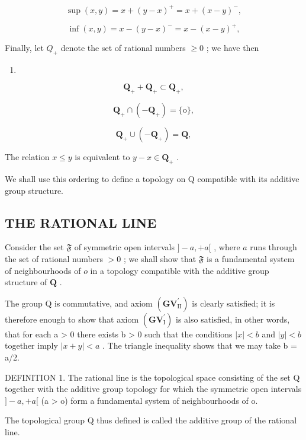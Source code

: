 \[
\sup (x, y) = x + (y - x) ^ {+} = x + (x - y) ^ {-},\tag{6}
\]

\[
\inf (x, y) = x - (y - x) ^ {-} = x - (x - y) ^ {+},\tag{7}
\]

Finally, let \(Q_{+}\) denote the set of rational numbers \(\geqslant0\) ; we have then

\begin{enumerate}
\def\labelenumi{(\arabic{enumi})}
\setcounter{enumi}{7}
\tightlist
\item
\end{enumerate}

\[
\mathbf {Q} _ {+} + \mathbf {Q} _ {+} \subset \mathbf {Q} _ {+},\tag{8}
\]

\[
\mathbf {Q} _ {+} \cap (- \mathbf {Q} _ {+}) = \{\mathrm{o} \},\tag{9}
\]

\[
\mathbf {Q} _ {+} \cup (- \mathbf {Q} _ {+}) = \mathbf {Q},\tag{10}
\]

The relation \(x \leqslant y\) is equivalent to \(y - x \in \mathbf{Q}_{+}\) .

We shall use this ordering to define a topology on Q compatible with its additive group structure.

\subsection{THE RATIONAL LINE}

Consider the set \(\mathfrak{F}\) of symmetric open intervals \(]-a, +a[\) , where \(a\) runs through the set of rational numbers \(>0\) ; we shall show that \(\mathfrak{F}\) is a fundamental system of neighbourhoods of \(o\) in a topology compatible with the additive group structure of \(\mathbf{Q}\) .

The group Q is commutative, and axiom \((\mathbf{GV}_{\mathrm{II}}^{\prime})\) is clearly satisfied; it is therefore enough to show that axiom \((\mathbf{GV}_{\mathrm{I}}^{\prime})\) is also satisfied, in other words, that for each a \textgreater{} 0 there exists b \textgreater{} 0 such that the conditions \(|x| < b\) and \(|y| < b\) together imply \(|x + y| < a\) . The triangle inequality shows that we may take b = a/2.

DEFINITION 1. The rational line is the topological space consisting of the set Q together with the additive group topology for which the symmetric open intervals \(]-a, +a[\) (a \textgreater{} o) form a fundamental system of neighbourhoods of o.

The topological group Q thus defined is called the additive group of the rational line.

